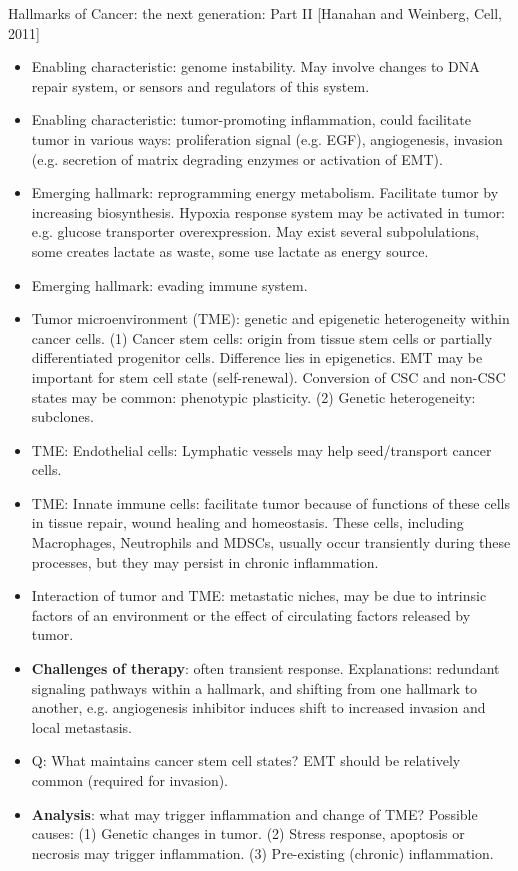 \documentclass{report}
\begin{document}
Hallmarks of Cancer: the next generation: Part II [Hanahan and Weinberg, Cell, 2011]
\begin{itemize}
	
	\item Enabling characteristic: genome instability. May involve changes to DNA repair system, or sensors and regulators of this system. 
	
	\item Enabling characteristic: tumor-promoting inflammation, could facilitate tumor in various ways: proliferation signal (e.g. EGF), angiogenesis, invasion (e.g. secretion of matrix degrading enzymes or activation of EMT).  
	
	\item Emerging hallmark: reprogramming energy metabolism. Facilitate tumor by increasing biosynthesis. Hypoxia response system may be activated in tumor: e.g. glucose transporter overexpression. May exist several subpolulations, some creates lactate as waste, some use lactate as energy source. 
	
	\item Emerging hallmark: evading immune system. 
	
	\item Tumor microenvironment (TME): genetic and epigenetic heterogeneity within cancer cells. (1) Cancer stem cells: origin from tissue stem cells or partially differentiated progenitor cells. Difference lies in epigenetics. EMT may be important for stem cell state (self-renewal). Conversion of CSC and non-CSC states may be common: phenotypic plasticity. (2) Genetic heterogeneity: subclones. 
	
	\item TME: Endothelial cells: Lymphatic vessels may help seed/transport cancer cells. 
	
	\item TME: Innate immune cells: facilitate tumor because of functions of these cells in tissue repair, wound healing and homeostasis. These cells, including Macrophages, Neutrophils and MDSCs, usually occur transiently during these processes, but they may persist in chronic inflammation. 
	
	\item Interaction of tumor and TME: metastatic niches, may be due to intrinsic factors of an environment or the effect of circulating factors released by tumor. 
	
	\item \textbf{Challenges of therapy}: often transient response. Explanations: redundant signaling pathways within a hallmark, and shifting from one hallmark to another, e.g. angiogenesis inhibitor induces shift to increased invasion and local metastasis. 
	
	\item Q: What maintains cancer stem cell states? EMT should be relatively common (required for invasion). 
	
	\item \textbf{Analysis}: what may trigger inflammation and change of TME? Possible causes: (1) Genetic changes in tumor. (2) Stress response, apoptosis or necrosis may trigger inflammation. (3) Pre-existing (chronic) inflammation. 
\end{itemize}
\end{document}
